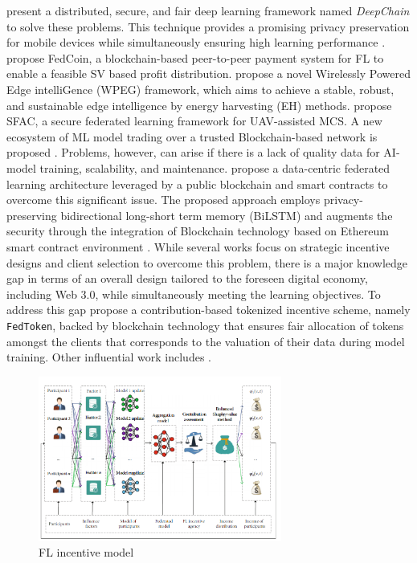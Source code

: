 \documentclass{article}
\begin{document}
\newline \newline \cite{weng_2019} present a distributed, secure, and fair deep learning framework named \textit{DeepChain} to solve these problems. This technique provides a promising privacy preservation for mobile devices while simultaneously ensuring high learning performance \cite{kang_2019}. \cite{liu_fedcoin_2020} propose FedCoin, a blockchain-based peer-to-peer payment system for FL to enable a feasible SV based profit distribution. \cite{lin_2022} propose a novel Wirelessly Powered Edge intelliGence (WPEG) framework, which aims to achieve a stable, robust, and sustainable edge intelligence by energy harvesting (EH) methods. \cite{wang_2020} propose SFAC, a secure federated learning framework for UAV-assisted MCS. A new ecosystem of ML model trading over a trusted Blockchain-based network is proposed \cite{nguyen_2021}. Problems, however, can arise if there is a lack of quality data for AI-model training, scalability, and maintenance. \cite{chaabene_2022} propose a data-centric federated learning architecture leveraged by a public blockchain and smart contracts to overcome this significant issue. The proposed approach employs privacy-preserving bidirectional long-short term memory (BiLSTM) and augments the security through the integration of Blockchain technology based on Ethereum smart contract environment \cite{rahmadika_2022}. While several works focus on strategic incentive designs and client selection to overcome this problem, there is a major knowledge gap in terms of an overall design tailored to the foreseen digital economy, including Web 3.0, while simultaneously meeting the learning objectives. To address this gap \cite{pandey_2022} propose a contribution-based tokenized incentive scheme, namely \texttt{FedToken}, backed by blockchain technology that ensures fair allocation of tokens amongst the clients that corresponds to the valuation of their data during model training. Other influential work includes \cite{lu_2020}. 
\begin{figure}[!ht]
    \centering
    \includegraphics[width=8cm]{assets/incentiveGraph.PNG}
    \caption{FL incentive model}
    \label{fig:incentive_graph}
\end{figure}
\end{document}
